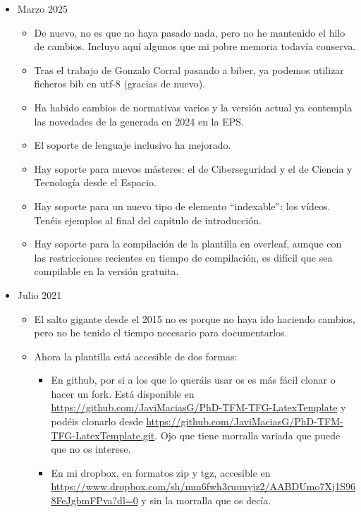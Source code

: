 \begin{itemize}

  \item Marzo 2025
        \begin{itemize}

          \item De nuevo, no es que no haya pasado nada, pero no he mantenido el hilo de cambios. Incluyo aquí algunos que mi pobre memoria todavía conserva.

          \item Tras el trabajo de Gonzalo Corral pasando a biber, ya podemos utilizar ficheros bib en utf-8 (gracias de nuevo).

          \item Ha habido cambios de normativas varios y la versión actual ya contempla las novedades de la generada en 2024 en la EPS.

          \item El soporte de lenguaje inclusivo ha mejorado.

          \item Hay soporte para nuevos másteres: el de Ciberseguridad y el de Ciencia y Tecnología desde el Espacio.

          \item Hay soporte para un nuevo tipo de elemento ``indexable'': los vídeos. Tenéis ejemplos al final del capítulo de introducción.

          \item Hay soporte para la compilación de la plantilla en overleaf, aunque con las restricciones recientes en tiempo de compilación, es difícil que sea compilable en la versión gratuita.

        \end{itemize}

  \item Julio 2021
        \begin{itemize}

          \item El salto gigante desde el 2015 no es porque no haya ido
                haciendo cambios, pero no he tenido el tiempo necesario para
    documentarlos.
    
  \item Ahora la plantilla está accesible de dos formas:
    \begin{itemize}
    
    \item En github, por si a los que lo queráis usar os es más fácil
      clonar o hacer un fork. Está disponible en
      \url{https://github.com/JaviMaciasG/PhD-TFM-TFG-LatexTemplate} y
      podéis clonarlo desde
      \url{https://github.com/JaviMaciasG/PhD-TFM-TFG-LatexTemplate.git}. Ojo
      que tiene morralla variada que puede que no os interese.
    \item En mi dropbox, en formatos zip y tgz, accesible en
      \url{https://www.dropbox.com/sh/mm6fwh3ruuuyjz2/AABDUmo7Xj1S968FeJgbmFPva?dl=0}
      y sin la morralla que os decía.
      

\end{itemize}
\end{itemize}
\end{itemize}
